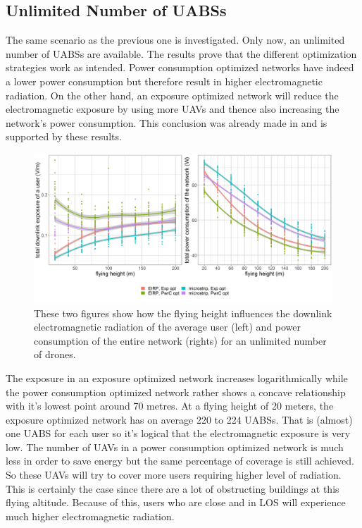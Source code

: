 \documentclass[twocolumn]{phdsymp} %
\begin{document}
\subsection{Unlimited Number of UABSs}
The same scenario  as the previous one is investigated. Only now, an unlimited number of \gls{UABS}s are available.
The results prove that the different optimization strategies work as intended.
Power consumption optimized networks have indeed a lower power consumption but therefore result in higher electromagnetic radiation.
On the other hand, an exposure optimized network will reduce the electromagnetic exposure by using more \gls{UAV}s and thence also increasing the network's power consumption.
This conclusion was already made  in \cite{J1} and is supported by these results.
\begin{figure}[h!]
  \includegraphics[width=\linewidth]{../results/s3/fhvsdlAndPc.png}
  \caption{These two figures show how the flying height influences the downlink electromagnetic radiation of the average user (left) and 
  power consumption of the entire network (rights) for an unlimited number of drones.}
  \label{fig:s3a_dlAndPc}
\end{figure}

The exposure in an exposure optimized network increases logarithmically while the power consumption optimized network rather 
shows a concave relationship with it's lowest point around 70 metres.
At a flying height of 20 meters, the exposure optimized network has on average 220 to 224 \gls{UABS}s. That is (almost) one \gls{UABS} for each user
so it's logical that the electromagnetic exposure is very low.
The number of \gls{UAV}s in a power consumption optimized network is much less in order 
to save energy but the same percentage of coverage is still achieved.
So these \gls{UAV}s will try to cover more users requiring higher level of radiation. This is certainly the case 
since there are a lot of obstructing buildings at this flying altitude.
Because of this, users who are close and in \gls{LOS} will experience much higher electromagnetic radiation.
\end{document}
